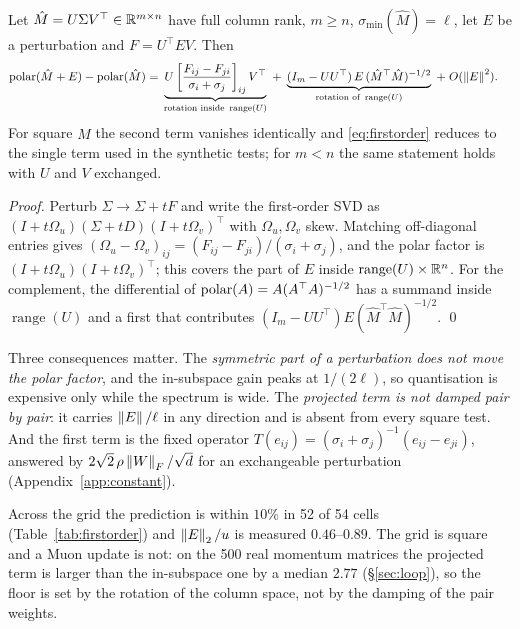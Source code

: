 \begin{theorem}
\label{thm:firstorder}
Let $\hat M = U\Sigma V^\top \in \mathbb{R}^{m\times n}$ have full column rank, $m\ge n$,
$\sigma_{\min}(\hat M) = \ell$, let $E$ be a perturbation and $F = U^\top E V$.
Then
\begin{equation}
\begin{aligned}
\operatorname{polar}(\hat M + E) - \operatorname{polar}(\hat M)
=\;& \underbrace{U\left[\frac{F_{ij}-F_{ji}}{\sigma_i+\sigma_j}\right]_{ij} V^\top}_{\text{rotation inside } \operatorname{range}(U)}
\;+\; \underbrace{(I_m - UU^\top)\,E\,(\hat M^\top\hat M)^{-1/2}}_{\text{rotation of } \operatorname{range}(U)}
\;+\; O(\left\lVert E \right\rVert^2).
\end{aligned}
\label{eq:firstorder}
\end{equation}
For square $\hat M$ the second term vanishes identically and
\eqref{eq:firstorder} reduces to the single term used in the synthetic tests; for
$m<n$ the same statement holds with $U$ and $V$ exchanged.
\end{theorem}

\begin{proof}
Perturb $\Sigma \to \Sigma + tF$ and write the first-order SVD as
$(I+t\Omega_u)(\Sigma+tD)(I+t\Omega_v)^\top$ with $\Omega_u,\Omega_v$ skew.  Matching
off-diagonal entries gives $(\Omega_u-\Omega_v)_{ij} = (F_{ij}-F_{ji})/(\sigma_i+\sigma_j)$,
and the polar factor is $(I+t\Omega_u)(I+t\Omega_v)^\top$; this covers the part of $E$
inside $\operatorname{range}(U)\times\mathbb{R}^n$.  For the complement, the differential of
$\operatorname{polar}(A) = A(A^\top A)^{-1/2}$ has a summand inside $\operatorname{range}(U)$ and a
first that contributes $(I_m-UU^\top)E(\hat M^\top\hat M)^{-1/2}$.  \qed
\end{proof}

Three consequences matter.  The \emph{symmetric part of a perturbation does not move the
polar factor}, and the in-subspace gain peaks at $1/(2\ell)$, so quantisation is expensive
only while the spectrum is wide.  The \emph{projected term is not damped pair by pair}:
it carries $\left\lVert E \right\rVert/\ell$ in any direction and is absent from every square test.  And the first term is the fixed operator $T(e_{ij})=(\sigma_i+\sigma_j)^{-1}(e_{ij}-e_{ji})$,
answered by $2\sqrt2\,\rho\left\lVert W \right\rVert_F/\sqrt d$ for an exchangeable perturbation
(Appendix~\ref{app:constant}).

Across the grid the prediction is within $10\%$ in 52 of 54 cells
(Table~\ref{tab:firstorder}) and $\left\lVert E \right\rVert_2/u$ is measured $0.46$--$0.89$.  The grid is square and a Muon update is not: on the 500 real momentum
matrices the projected term is larger than the in-subspace one by a median $2.77$
(\S\ref{sec:loop}), so the floor is set by the rotation of the column space, not by the
damping of the pair weights.


